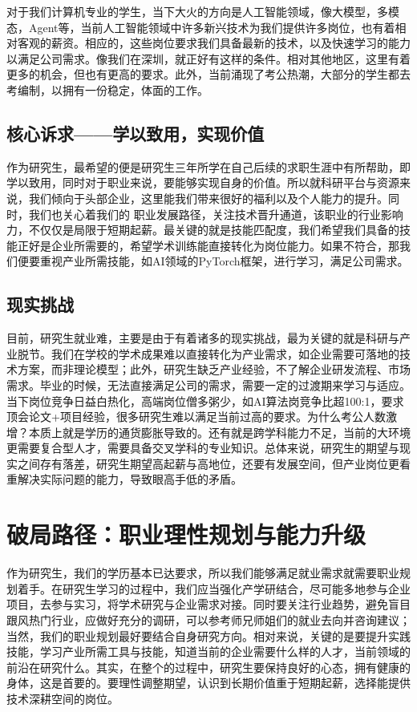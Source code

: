 \documentclass[12pt,a4paper]{ctexart}
\begin{document}
对于我们计算机专业的学生，当下大火的方向是人工智能领域，像大模型，多模态，Agent等，当前人工智能领域中许多新兴技术为我们提供许多岗位，也有着相对客观的薪资。相应的，这些岗位要求我们具备最新的技术，以及快速学习的能力以满足公司需求。像我们在深圳，就正好有这样的条件。相对其他地区，这里有着更多的机会，但也有更高的要求。此外，当前涌现了考公热潮，大部分的学生都去考编制，以拥有一份稳定，体面的工作。

\subsection{核心诉求——学以致用，实现价值}

作为研究生，最希望的便是研究生三年所学在自己后续的求职生涯中有所帮助，即学以致用，同时对于职业来说，要能够实现自身的价值。所以就科研平台与资源来说，我们倾向于头部企业，这里能我们带来很好的福利以及个人能力的提升。同时，我们也关心着我们的 职业发展路径，关注技术晋升通道，该职业的行业影响力，不仅仅是局限于短期起薪。最关键的就是技能匹配度，我们希望我们具备的技能正好是企业所需要的，希望学术训练能直接转化为岗位能力。如果不符合，那我们便要重视产业所需技能，如AI领域的PyTorch框架，进行学习，满足公司需求。

\subsection{现实挑战}

目前，研究生就业难，主要是由于有着诸多的现实挑战，最为关键的就是科研与产业脱节。我们在学校的学术成果难以直接转化为产业需求，如企业需要可落地的技术方案，而非理论模型；此外，研究生缺乏产业经验，不了解企业研发流程、市场需求。毕业的时候，无法直接满足公司的需求，需要一定的过渡期来学习与适应。当下岗位竞争日益白热化，高端岗位僧多粥少，如AI算法岗竞争比超100:1，要求顶会论文+项目经验，很多研究生难以满足当前过高的要求。为什么考公人数激增？本质上就是学历的通货膨胀导致的。还有就是跨学科能力不足，当前的大环境更需要复合型人才，需要具备交叉学科的专业知识。总体来说，研究生的期望与现实之间存有落差，研究生期望高起薪与高地位，还要有发展空间，但产业岗位更看重解决实际问题的能力，导致眼高手低的矛盾。

\section{破局路径：职业理性规划与能力升级}

作为研究生，我们的学历基本已达要求，所以我们能够满足就业需求就需要职业规划着手。在研究生学习的过程中，我们应当强化产学研结合，尽可能多地参与企业项目，去参与实习，将学术研究与企业需求对接。同时要关注行业趋势，避免盲目跟风热门行业，应做好充分的调研，可以参考师兄师姐们的就业去向并咨询建议；当然，我们的职业规划最好要结合自身研究方向。相对来说，关键的是要提升实践技能，学习产业所需工具与技能，知道当前的企业需要什么样的人才，当前领域的前沿在研究什么。其实，在整个的过程中，研究生要保持良好的心态，拥有健康的身体，这是首要的。要理性调整期望，认识到长期价值重于短期起薪，选择能提供技术深耕空间的岗位。
\end{document}
